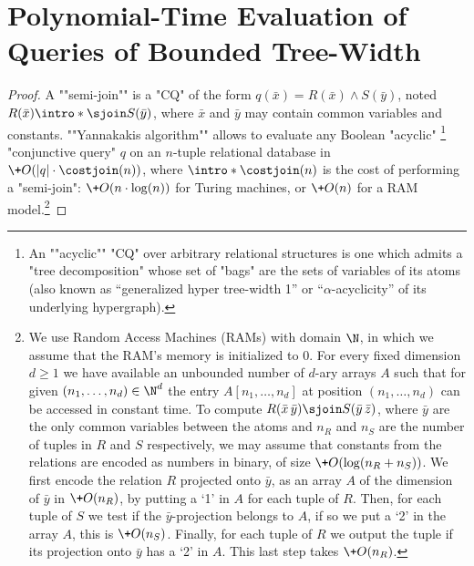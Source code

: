 \section{\AP{}Polynomial-Time Evaluation of Queries of Bounded Tree-Width}
\label{apdx-sec:prop:crpq-bound-tree-width-upper-bound}

\crpqboundtwupperbound*
\begin{proof}
    \AP
    \knowledgenewrobustcmd{\sjoin}{\cmdkl{\ltimes}}
    A ""semi-join"" is a "CQ" of the form $q(\bar x) = R(\bar x) \land S(\bar y)$, noted $R(\bar x) \intro*\sjoin S(\bar y)$, where $\bar x$ and $\bar y$ may contain common variables and constants. \AP ""Yannakakis algorithm"" \cite{Yannakakis81} allows to evaluate any Boolean "acyclic"%
	\footnote{%
	An \AP""acyclic"" "CQ" over arbitrary relational structures is one which admits a "tree decomposition" whose set of "bags" are the sets of variables of its atoms (also known as ``generalized hyper tree-width 1'' or ``$\alpha$-acyclicity'' of its underlying hypergraph).
	} 
	"conjunctive query" $q$ on an $n$-tuple relational database in $\+O(|q| \cdot \costjoin(n))$, where $\intro*\costjoin(n)$ is the cost of performing a "semi-join": $\+O(n \cdot \log(n))$ for Turing machines, or $\+O(n)$ for a RAM model.\footnote{
		We use Random Access Machines (RAMs) with domain $\N$, in which we assume that the RAM's memory is initialized to 0. 
		For every fixed dimension $d \geq 1$  we have available an unbounded number of $d$-ary arrays $A$ such that for given $(n_1, \dotsc, n_d) \in \N^d$ the entry $A[n_1, \dotsc, n_d]$ at position $(n_1, \dotsc, n_d)$ can be accessed in constant time.
		To compute $R(\bar x \, \bar y) \sjoin S(\bar y \, \bar z)$, where $\bar y$ are the only common variables between the atoms and $n_R$ and $n_S$ are the number of tuples in $R$ and $S$ respectively, we may assume that constants from the relations are encoded as numbers in binary, of size $\+O(\log(n_R + n_S))$. 
		We first encode the relation $R$ projected onto $\bar y$, as an array $A$ of the dimension of $\bar y$ in $\+O(n_R)$, by putting a `1' in $A$ for each tuple of $R$. 
		Then, for each tuple of $S$ we test if the $\bar y$-projection belongs to $A$, if so we put a `2' in the array $A$, this is $\+O(n_S)$. 
		Finally, for each tuple of $R$ we output the tuple if its projection onto $\bar y$ has a `2' in $A$. This last step takes $\+O(n_R)$.
	}


\end{proof}

